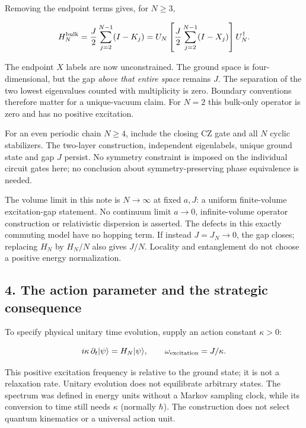 \documentclass[11pt,a4paper]{article}
\begin{document}
Removing the endpoint terms gives, for \(N\ge3\),

\[
H_N^{\rm bulk}=\frac J2\sum_{j=2}^{N-1}(I-K_j)
=U_N\left[\frac J2\sum_{j=2}^{N-1}(I-X_j)\right]U_N^\dagger.
\]

The endpoint \(X\) labels are now unconstrained. The ground space is
four-dimensional, but the gap \emph{above that entire space} remains
\(J\). The separation of the two lowest eigenvalues counted with
multiplicity is zero. Boundary conventions therefore matter for a
unique-vacuum claim. For \(N=2\) this bulk-only operator is zero and has
no positive excitation.

For an even periodic chain \(N\ge4\), include the closing CZ gate and
all \(N\) cyclic stabilizers. The two-layer construction, independent
eigenlabels, unique ground state and gap \(J\) persist. No symmetry
constraint is imposed on the individual circuit gates here; no
conclusion about symmetry-preserving phase equivalence is needed.

The volume limit in this note is \(N\to\infty\) at fixed \(a,J\): a
uniform finite-volume excitation-gap statement. No continuum limit
\(a\to0\), infinite-volume operator construction or relativistic
dispersion is asserted. The defects in this exactly commuting model have
no hopping term. If instead \(J=J_N\to0\), the gap closes; replacing
\(H_N\) by \(H_N/N\) also gives \(J/N\). Locality and entanglement do
not choose a positive energy normalization.

\hypertarget{the-action-parameter-and-the-strategic-consequence}{%
\subsection{4. The action parameter and the strategic
consequence}\label{the-action-parameter-and-the-strategic-consequence}}

To specify physical unitary time evolution, supply an action constant
\(\kappa>0\):

\[
i\kappa\,\partial_t|\psi\rangle=H_N|\psi\rangle,
\qquad \omega_{\rm excitation}=J/\kappa.
\]

This positive excitation frequency is relative to the ground state; it
is not a relaxation rate. Unitary evolution does not equilibrate
arbitrary states. The spectrum was defined in energy units without a
Markov sampling clock, while its conversion to time still needs
\(\kappa\) (normally \(\hbar\)). The construction does not select
quantum kinematics or a universal action unit.
\end{document}
